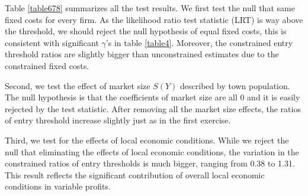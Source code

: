 \documentclass[a4paper,11pt]{article}
\begin{document}
Table \ref{table678} summarizes all the test results. We first test the null that same fixed costs for every firm. As the likelihood ratio test statistic (LRT) is way above the threshold, we should reject the null hypothesis of equal fixed costs, this is consistent with significant $\gamma$'s in table \ref{table4}. Moreover, the constrained entry threshold ratios are slightly bigger than unconstrained estimates due to the constrained fixed costs.

Second, we test the effect of market size $S(Y)$ described by town population. The null hypothesis is that the coefficients of market size are all 0 and it is easily rejected by the test statistic. After removing all the market size effects, the ratios of entry threshold increase slightly just as in the first exercise.

Third, we test for the effects of local economic conditions. While we reject the null that eliminating the effects of local economic conditions, the variation in the constrained ratios of entry thresholds is much bigger, ranging from 0.38 to 1.31. This result reflects the significant contribution of overall local economic conditions in variable profits. 
\end{document}
